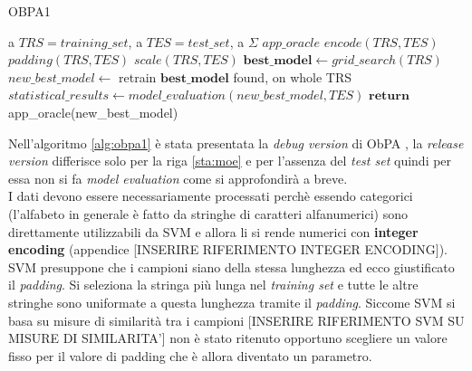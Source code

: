 \begin{algorithm}
\caption{OBPA1}\label{alg:obpa1}
\begin{algorithmic}[1]
\Statex
\Input a $TRS = training\_set$, a $TES = test\_set$, a $\Sigma$   
\Output $app\_oracle$
\State $encode(TRS , TES)$
\State $padding(TRS , TES)$
\State $scale(TRS , TES)$
\State $\textbf{best\_model} \gets grid\_search(TRS)$ \label{sta:quattro}
\State $new\_best\_model \gets$ retrain $\textbf{best\_model}$ found, on whole TRS
\State $statistical\_results \gets model\_evaluation(new\_best\_model,TES)$ \label{sta:moe}
\State $\textbf{return}$ app\_oracle(new\_best\_model) 

   
\end{algorithmic}
\end{algorithm}
Nell'algoritmo \ref{alg:obpa1} è stata presentata la \textit{debug version} di \ac{ObPA} , la \textit{release version} differisce solo per la riga \ref{sta:moe} e per l'assenza del \textit{test set} quindi per essa non si fa \textit{model evaluation} come si approfondirà a breve.\\
I dati devono essere necessariamente processati perchè essendo categorici (l'alfabeto in generale è fatto da stringhe di caratteri alfanumerici) sono direttamente utilizzabili da \ac{SVM} e allora li si rende numerici con \textbf{integer encoding} (appendice [INSERIRE RIFERIMENTO INTEGER ENCODING]).\\
\ac{SVM} presuppone che i campioni siano della stessa lunghezza ed ecco giustificato il \textit{padding}. Si seleziona la stringa più lunga nel \textit{training set} e tutte le altre stringhe sono uniformate a questa lunghezza tramite il \textit{padding}. Siccome \ac{SVM} si basa su misure di similarità tra i campioni [INSERIRE RIFERIMENTO SVM SU MISURE DI SIMILARITA'] non è stato ritenuto opportuno scegliere un valore fisso per il valore di padding che è allora diventato un parametro.\\
